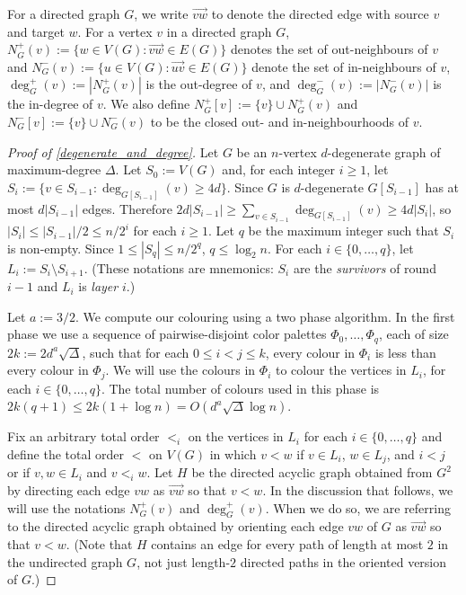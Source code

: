 \documentclass{patmorin}
\newcommand{\defin}[1]{\emph{\color{brightmaroon}#1}}
\begin{document}
For a directed graph $G$, we write $\overrightarrow{vw}$ to denote the directed edge with source $v$ and target $w$.  For a vertex $v$ in a directed graph $G$, $N^+_{G}(v):=\{w\in V(G):\overrightarrow{vw}\in E(G)\}$ denotes the set of out-neighbours of $v$ and $N^-_G(v):=\{u\in V(G):\overrightarrow{uv}\in E(G)\}$ denote the set of in-neighbours of $v$, $\deg^+_{G}(v):=|N^+_G(v)|$ is the out-degree of $v$, and $\deg^-_{G}(v):=|N^-_G(v)|$ is the in-degree of $v$.  We also define $N^+_{G}[v]:=\{v\}\cup N^+_{G}(v)$ and $N^-_{G}[v]:=\{v\}\cup N^-_{G}(v)$ to be the closed out- and in-neighbourhoods of $v$.


\begin{proof}[Proof of \cref{degenerate_and_degree}]
  Let $G$ be an $n$-vertex $d$-degenerate graph of maximum-degree $\Delta$.  Let $S_0:=V(G)$ and, for each integer $i\ge 1$, let $S_i:=\{v\in S_{i-1}:\deg_{G[S_{i-1}]}(v)\ge 4d\}$.  Since $G$ is $d$-degenerate $G[S_{i-1}]$ has at most $d|S_{i-1}|$ edges.  Therefore $2d|S_{i-1}|\ge \sum_{v\in S_{i-1}} \deg_{G[S_{i-1}]}(v)\ge 4d|S_i|$, so $|S_i|\le |S_{i-1}|/2\le n/2^i$ for each $i\ge 1$.  Let $q$ be the maximum integer such that $S_i$ is non-empty.  Since $1\le |S_q|\le n/2^q$, $q\le \log_2 n$.  For each $i\in\{0,\ldots,q\}$, let $L_i:=S_i\setminus S_{i+1}$.  (These notations are mnemonics: $S_i$ are the \defin{survivors} of round $i-1$ and $L_i$ is \defin{layer} $i$.)

  Let $a:=3/2$.
  We compute our colouring using a two phase algorithm. In the first phase we use a sequence of pairwise-disjoint color palettes $\Phi_0,\ldots,\Phi_{q}$, each of size $2k:=2d^{a}\sqrt{\Delta}$, such that for each $0\le i < j\le k$, every colour in $\Phi_i$ is less than every colour in $\Phi_j$.  We will use the colours in $\Phi_i$ to colour the vertices in $L_i$, for each $i\in\{0,\ldots,q\}$.  The total number of colours used in this phase is $2k(q+1)\le 2k(1+\log n)=O(d^{a}\sqrt{\Delta}\log n)$.


  Fix an arbitrary total order $<_i$ on the vertices in $L_i$ for each $i\in\{0,\ldots,q\}$ and define the total order $<$ on $V(G)$ in which $v <w$ if $v\in L_i$, $w\in L_j$, and $i<j$ or if $v,w\in L_i$ and $v<_iw$. Let $H$ be the directed acyclic graph obtained from $G^2$ by directing each edge $vw$ as $\overrightarrow{vw}$ so that $v<w$.  In the discussion that follows, we will use the notations $N^+_G(v)$ and $\deg^+_G(v)$.  When we do so, we are referring to the directed acyclic graph obtained by orienting each edge $vw$ of $G$ as $\overrightarrow{vw}$ so that $v<w$.  (Note that $H$ contains an edge for every path of length at most $2$ in the undirected graph $G$, not just length-$2$ directed paths in the oriented version of $G$.)


\end{proof}
\end{document}
